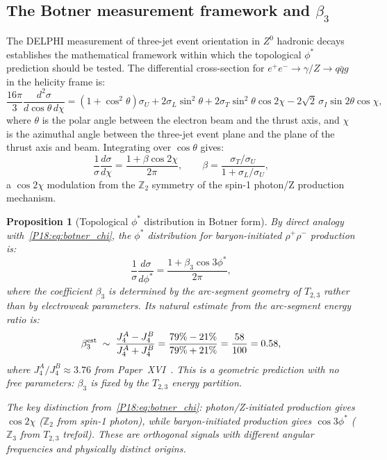 \documentclass[11pt,a4paper]{article}
\newtheorem{proposition}[theorem]{Proposition}
\theoremstyle{definition}\newtheorem{definition}[theorem]{Definition}
\theoremstyle{remark}
\newcommand{\Zthree}{\mathbb{Z}_3}
\newcommand{\phistar}{\phi^*}
\begin{document}
\subsection{The Botner measurement framework and $\beta_3$}
\label{P18:sec:botner}

The DELPHI measurement of three-jet event orientation in $Z^0$
hadronic decays~\cite{Botner1992} establishes the mathematical
framework within which the topological $\phistar$ prediction
should be tested.  The differential cross-section for
$e^+e^-\to\gamma/Z\to q\bar{q}g$ in the helicity frame is:
\begin{equation}
  \frac{16\pi}{3}\frac{d^2\sigma}{d\cos\theta\,d\chi}
  = (1+\cos^2\!\theta)\sigma_U + 2\sigma_L\sin^2\!\theta
    + 2\sigma_T\sin^2\!\theta\cos 2\chi
    - 2\sqrt{2}\,\sigma_I\sin 2\theta\cos\chi,
  \label{P18:eq:botner_full}
\end{equation}
where $\theta$ is the polar angle between the electron beam and
the thrust axis, and $\chi$ is the azimuthal angle between the
three-jet event plane and the plane of the thrust axis and beam.
Integrating over $\cos\theta$ gives:
\begin{equation}
  \frac{1}{\sigma}\frac{d\sigma}{d\chi}
  = \frac{1+\beta\cos 2\chi}{2\pi},
  \qquad
  \beta = \frac{\sigma_T/\sigma_U}{1+\sigma_L/\sigma_U},
  \label{P18:eq:botner_chi}
\end{equation}
a $\cos 2\chi$ modulation from the $\mathbb{Z}_2$ symmetry of
the spin-1 photon/Z production mechanism.

\begin{proposition}[Topological $\phistar$ distribution in Botner form]
\label{P18:prop:botner_analog}
By direct analogy with~\eqref{P18:eq:botner_chi}, the $\phistar$
distribution for baryon-initiated $\rho^+\rho^-$ production is:
\begin{equation}
  \frac{1}{\sigma}\frac{d\sigma}{d\phistar}
  = \frac{1+\beta_3\cos 3\phistar}{2\pi},
  \label{P18:eq:botner_phiS}
\end{equation}
where the coefficient $\beta_3$ is determined by the arc-segment
geometry of $T_{2,3}$ rather than by electroweak parameters.
Its natural estimate from the arc-segment energy ratio is:
\begin{equation}
  \beta_3^{\rm est} \;\sim\;
  \frac{J_4^A - J_4^B}{J_4^A + J_4^B}
  = \frac{79\% - 21\%}{79\% + 21\%}
  = \frac{58}{100} = 0.58,
  \label{P18:eq:beta3_est}
\end{equation}
where $J_4^A/J_4^B \approx 3.76$ from Paper~XVI~\cite{Paper16}.
This is a geometric prediction with no free parameters:
$\beta_3$ is fixed by the $T_{2,3}$ energy partition.

The key distinction from~\eqref{P18:eq:botner_chi}:
photon/Z-initiated production gives $\cos 2\chi$
($\mathbb{Z}_2$ from spin-1 photon), while baryon-initiated
production gives $\cos 3\phistar$ ($\Zthree$ from $T_{2,3}$
trefoil).  These are orthogonal signals with different
angular frequencies and physically distinct origins.
\end{proposition}
\end{document}
